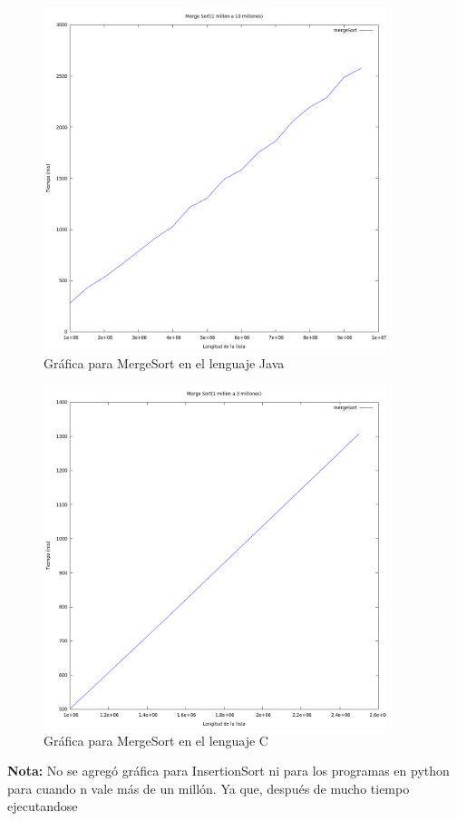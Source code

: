 \documentclass[11 pt, a4paper]{article}
\theoremstyle{definition}
\begin{document}
\begin{enumerate}
  \begin{figure}[H]
         \centering
          \includegraphics[trim=0cm 0cm 0cm 0cm, width=10cm]{1-10Java.png} 
          \caption{Gráfica para MergeSort en el lenguaje Java}
      \end{figure}
       \begin{figure}[H]
         \centering
          \includegraphics[trim=0cm 0cm 0cm 0cm, width=10cm]{1-2C.png} 
          \caption{Gráfica para MergeSort en el lenguaje C}
      \end{figure}
   \textbf{Nota:} No se agregó gráfica para InsertionSort ni para los programas en 
   python para cuando n vale más de un millón. Ya que, después de mucho tiempo ejecutandose

\end{enumerate}
\end{document}
